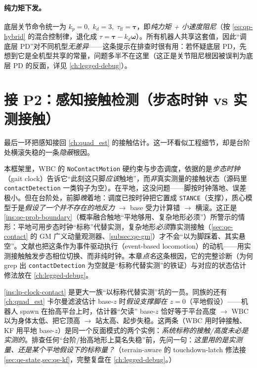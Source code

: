 \paragraph{纯力矩下发。}
底层关节命令统一为 $k_p=0,\;k_d=3,\;\tau_{\mathrm{ff}}=\boldsymbol{\tau}$，即\emph{纯力矩 + 小速度阻尼}（按 \cref{eq:qp-hybrid} 的混合控制律，退化成 $\tau=\boldsymbol{\tau}-k_d\boldsymbol{\omega}$）。所有机器人共享这套值，因此“调底层 PD”对不同机型\emph{无差异}——这条提示在排查时很有用：若怀疑底层 PD，先想到它是全机型共享的常量，问题多半不在这里（这正是关节阻尼根因被误判为底层 PD 的反面，详见 \cref{ch:legged-debug}）。

\section{接 P2：感知接触检测（步态时钟 vs 实测接触）}
\label{sec:lp-contact}

最后一环把感知接回 \cref{ch:quad_est} 的接触估计。这一环看似工程细节，却是台阶处横滚失稳的一条\emph{隐蔽}根因。

\begin{insight}\label{ins:lp-clock-contact}
本框架里，WBC 的 \texttt{NoContactMotion} 硬约束与步态调度，依据的是\emph{步态时钟}（gait clock）告诉它“此刻这只脚\emph{应该}触地”，而\emph{非}真实测量的接触状态（源码里 \texttt{contactDetection} 一类钩子为空）。在平地，这没问题——脚按时钟落地、误差极小。但在台阶处，前脚\emph{晚}着地：调度已按时钟把它置成 \texttt{STANCE}（支撑），质心模型于是\emph{假设了一个并不存在的地反力} $\to$ base 受力计算错 $\to$ 横滚。这正是 \cref{ins:qe-prob-boundary}（概率融合触地“平地够用、复杂地形必须”）所警示的情形：平地可用步态时钟“标称”代替实测，复杂地形\emph{必须}靠实测接触（\cref{sec:qe-contact} 的 GM 广义动量观测器、\cref{subsec:qe-gm}）才不会“以为脚踩着、其实悬空”。文献也把这条作为事件驱动执行（event-based locomotion）的动机\cite{bledt2018contact}——用实测接触触发步态相位切换、而非纯时钟。本章\emph{点名}这条根因，它的完整诊断（为何 grep 出 \texttt{contactDetection} 为空就是“标称代替实测”的铁证）与对应的状态估计修法放在 \cref{ch:legged-debug}。
\end{insight}

\begin{pitfall}\label{pit:lp-nominal-contact}
\cref{ins:lp-clock-contact} 是更大一族“以标称代替实测”坑的一员。同族的还有 \cref{ch:quad_est} 卡尔曼滤波估计 base-$z$ 时\emph{假设支撑脚在 $z=0$}（平地假设）——机器人 spawn 在抬高平台上时，估计器“欠读” base-$z$ 恰好等于平台高度 $\to$ WBC 以为身体太低、把它顶高 $\to$ 站太高、起步失稳。这两条（WBC 用时钟接触、KF 用平地 base-$z$）是同一个反面模式的两个实例：\emph{系统标称的接触/高度未必是实测的}。排查任何“台阶/抬高地形上莫名失稳”前，先问一句：\emph{这里用的是实测量、还是某个平地假设下的标称量？}（terrain-aware 的 touchdown-latch 修法接 \cref{sec:qe-state,sec:qe-kf}，完整复盘在 \cref{ch:legged-debug}。）
\end{pitfall}

